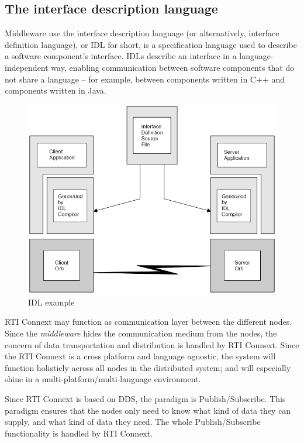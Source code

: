 \subsection{The interface description language}
Middleware use the interface description language (or alternatively, interface definition language), or IDL for short, is a specification language used to describe a software component's interface. IDLs describe an interface in a language-independent way, enabling communication between software components that do not share a language – for example, between components written in C++ and components written in Java.

\begin{figure}[ht!]
\centering
\includegraphics[width=150mm]{img/IDL.png}
\caption{IDL example}
\label{IDL}
\end{figure}

RTI Connext may function as communication layer between the different nodes. Since the \emph{middleware} hides the communication medium from the nodes, the concern of data transportation and distribution is handled by RTI Connext.
Since the RTI Connext is a cross platform and language agnostic, the system will function holisticly across all nodes in the distributed system; and will especially shine in a multi-platform/multi-language environment.

Since RTI Connext is based on DDS, the paradigm is Publish/Subscribe. This paradigm ensures that the nodes only need to know what kind of data they can supply, and what kind of data they need. The whole Publish/Subscribe functionality is handled by RTI Connext. 